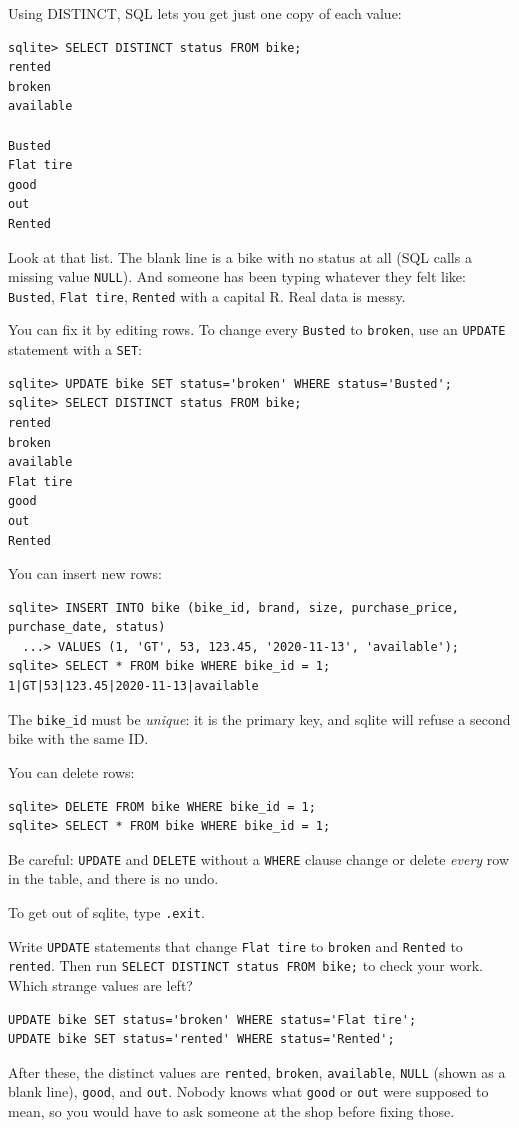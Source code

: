Using DISTINCT, SQL lets you get just one copy of each value:
\begin{verbatim}
sqlite> SELECT DISTINCT status FROM bike;
rented
broken
available

Busted
Flat tire
good
out
Rented
\end{verbatim}

Look at that list. The blank line is a bike with no status at all
(SQL calls a missing value \texttt{NULL}). And someone has been typing
whatever they felt like: \texttt{Busted}, \texttt{Flat tire},
\texttt{Rented} with a capital R. Real data is messy.

You can fix it by editing rows. To change every \texttt{Busted} to
\texttt{broken}, use an \verb|UPDATE| statement with a
\verb|SET|:

\begin{verbatim}
sqlite> UPDATE bike SET status='broken' WHERE status='Busted';
sqlite> SELECT DISTINCT status FROM bike;
rented
broken
available
Flat tire
good
out
Rented
\end{verbatim}

You can insert new rows:
\begin{verbatim}
sqlite> INSERT INTO bike (bike_id, brand, size, purchase_price, purchase_date, status)
  ...> VALUES (1, 'GT', 53, 123.45, '2020-11-13', 'available');
sqlite> SELECT * FROM bike WHERE bike_id = 1;
1|GT|53|123.45|2020-11-13|available
\end{verbatim}
The \texttt{bike\_id} must be \emph{unique}: it is the primary key, and
sqlite will refuse a second bike with the same ID.

You can delete rows:
\begin{verbatim}
sqlite> DELETE FROM bike WHERE bike_id = 1;
sqlite> SELECT * FROM bike WHERE bike_id = 1;
\end{verbatim}

Be careful: \verb|UPDATE| and \verb|DELETE| without a \verb|WHERE|
clause change or delete \emph{every} row in the table, and there is no
undo.

To get out of sqlite, type \texttt{.exit}.

\begin{Exercise}[title={Clean up the statuses}, label=sql_clean]
Write \verb|UPDATE| statements that change \texttt{Flat tire} to
\texttt{broken} and \texttt{Rented} to \texttt{rented}. Then run
\verb|SELECT DISTINCT status FROM bike;| to check your work. Which strange
values are left?
\end{Exercise}
\begin{Answer}[ref=sql_clean]
\begin{verbatim}
UPDATE bike SET status='broken' WHERE status='Flat tire';
UPDATE bike SET status='rented' WHERE status='Rented';
\end{verbatim}
After these, the distinct values are \texttt{rented}, \texttt{broken},
\texttt{available}, \texttt{NULL} (shown as a blank line), \texttt{good},
and \texttt{out}. Nobody knows what \texttt{good} or \texttt{out} were
supposed to mean, so you would have to ask someone at the shop before
fixing those.
\end{Answer}

